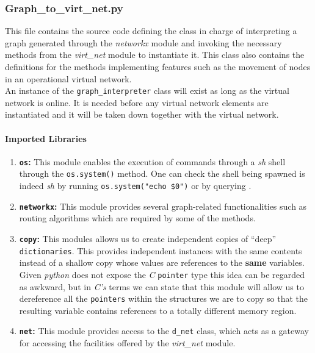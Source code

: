 \subsubsection{Graph\_to\_virt\_net.py}
   This file contains the source code defining the class in charge of interpreting a graph generated through the \textit{networkx} module and invoking the necessary methods from the \textit{virt\_net} module to instantiate it. This class also contains the definitions for the methods implementing features such as the movement of nodes in an operational virtual network.\\

   An instance of the \texttt{graph\_interpreter} class will exist as long as the virtual network is online. It is needed before any virtual network elements are instantiated and it will be taken down together with the virtual network.\\

   \paragraph{Imported Libraries}
        \begin{enumerate}
            \item \textbf{\texttt{os}:} This module enables the execution of commands through a \textit{sh} shell through the \texttt{os.system()} method. One can check the shell being spawned is indeed \textit{sh} by running \texttt{\allowbreak os.system("echo \$0")} or by querying \cite{bib:man-system}.
            \item \textbf{\texttt{networkx}:} This module provides several graph-related functionalities such as routing algorithms which are required by some of the methods.
            \item \textbf{\texttt{copy}:} This modules allows us to create independent copies of ``deep'' \texttt{dictionaries}. This provides independent instances with the same contents instead of a shallow copy whose values are references to the \textbf{same} variables. Given \textit{python} does not expose the \textit{C} \texttt{pointer} type this idea can be regarded as awkward, but in \textit{C's} terms we can state that this module will allow us to dereference all the \texttt{pointers} within the structures we are to copy so that the resulting variable contains references to a totally different memory region.
            \item \textbf{\texttt{net}:} This module provides access to the \texttt{d\_net} class, which acts as a gateway for accessing the facilities offered by the \textit{virt\_net} module.
        \end{enumerate}

